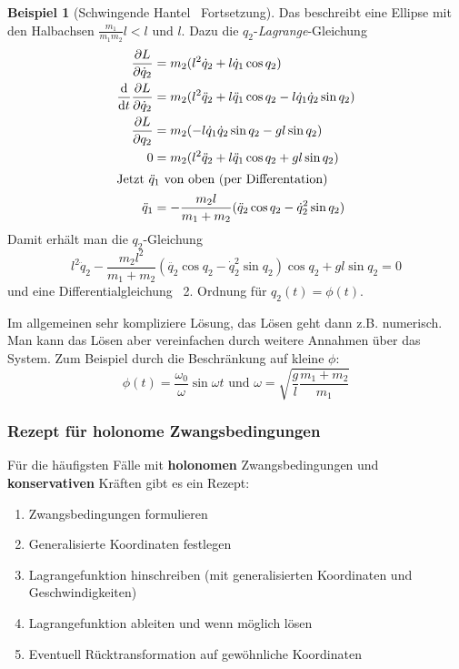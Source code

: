 \documentclass[oneside]{book}
\theoremstyle{definition}
\newtheorem*{beispiel*}{Beispiel}
\newcommand{\Dgl}{Differentialgleichung}
\renewcommand{\d}{\mathrm d}
\newcommand{\dd}[1]{\frac{\d}{\d #1}}
\newcommand{\ffpartial}[2]{\frac{\partial #1}{\partial #2}}
\begin{document}
{\begin{beispiel*}[Schwingende Hantel \textendash~Fortsetzung]
	Das beschreibt eine Ellipse mit den Halbachsen $\frac{m_1}{m_1 m_2}l < l \text{~und~} l$.
	Dazu die $q_2$-\textit{Lagrange}-Gleichung
	\begin{align*}
	\ffpartial{L}{\dot{q}_2} &= m_2 (l^2 \dot{q}_2 + l \dot{q}_1 \cos q_2)\\
	\dd t \ffpartial{L}{\dot{q}_2} &= m_2 (l^2 \ddot{q}_2 + l \ddot{q}_1 \cos q_2 - l \dot{q}_1 \dot{q}_2 \sin q_2)\\
	\ffpartial{L}{q_2} &= m_2 (- l \dot{q}_1 \dot{q}_2 \sin q_2 - g l \sin q_2)\\
	0 &= m_2 (l^2 \ddot{q}_2 + l \ddot{q}_1 \cos q_2 + g l \sin q_2)\\
	\intertext{Jetzt $\ddot{q}_1$ von oben (per Differentation)}
	\ddot{q}_1 &= - \frac{m_2 l}{m_1 + m_2} (\ddot{q}_2 \cos q_2 - \dot{q}_2^2 \sin q_2)
	\end{align*}
	Damit erhält man die $q_2$-Gleichung
	$$l^2 \ddot{q}_2 - \frac{m_2 l^2}{m_1 + m_2}(\ddot{q_2} \cos q_2 - \dot{q}_2^2 \sin q_2) \cos q_2 + g l \sin q_2 = 0$$
	und eine \Dgl~ 2. Ordnung für $q_2(t) = \phi(t)$.
	
	Im allgemeinen sehr kompliziere Lösung, das Lösen geht dann z.B. numerisch. Man kann das Lösen aber vereinfachen durch weitere Annahmen über das System. Zum Beispiel durch die Beschränkung auf kleine $\phi$:
	$$\phi(t) = \frac{\omega_0}{\omega} \sin \omega t \text{~und~} \omega = \sqrt{\frac{g}{l} \frac{m_1 + m_2}{m_1}}$$
\end{beispiel*}
}

\subsubsection{Rezept für holonome Zwangsbedingungen}

Für die häufigsten Fälle mit \textbf{holonomen} Zwangsbedingungen und \textbf{konservativen} Kräften gibt es ein Rezept:
\begin{enumerate}
	\item Zwangsbedingungen formulieren
	\item Generalisierte Koordinaten festlegen
	\item Lagrangefunktion hinschreiben (mit generalisierten Koordinaten und Geschwindigkeiten)
	\item Lagrangefunktion ableiten und wenn möglich lösen
	\item Eventuell Rücktransformation auf gewöhnliche Koordinaten
\end{enumerate}
\end{document}
